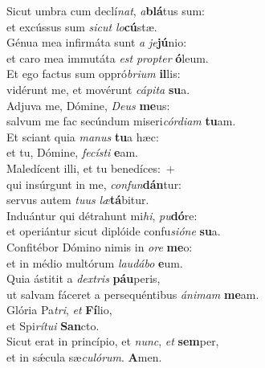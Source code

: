 \evenverse Sicut umbra cum declí\textit{nat}, \textit{a}\textbf{blá}tus sum:~\*\\
\evenverse et excússus sum \textit{si}\textit{cut} \textit{lo}\textbf{cú}stæ.\\
\oddverse Génua mea infirmáta sunt \textit{a} \textit{je}\textbf{jú}nio:~\*\\
\oddverse et caro mea immutáta \textit{est} \textit{prop}\textit{ter} \textbf{ó}leum.\\
\evenverse Et ego factus sum oppró\textit{bri}\textit{um} \textbf{il}lis:~\*\\
\evenverse vidérunt me, et movérunt \textit{cá}\textit{pi}\textit{ta} \textbf{su}a.\\
\oddverse Adjuva me, Dómine, \textit{De}\textit{us} \textbf{me}us:~\*\\
\oddverse salvum me fac secúndum miseri\textit{cór}\textit{di}\textit{am} \textbf{tu}am.\\
\evenverse Et sciant quia \textit{ma}\textit{nus} \textbf{tu}a hæc:~\*\\
\evenverse et tu, Dómine, \textit{fe}\textit{cí}\textit{sti} \textbf{e}am.\\
\oddverse Maledícent illi, et tu benedíces:~+\\
\oddverse  qui insúrgunt in me, \textit{con}\textit{fun}\textbf{dán}tur:~\*\\
\oddverse servus autem \textit{tu}\textit{us} \textit{læ}\textbf{tá}bitur.\\
\evenverse Induántur qui détrahunt mi\textit{hi}, \textit{pu}\textbf{dó}re:~\*\\
\evenverse et operiántur sicut diplóide confu\textit{si}\textit{ó}\textit{ne} \textbf{su}a.\\
\oddverse Confitébor Dómino nimis in \textit{o}\textit{re} \textbf{me}o:~\*\\
\oddverse et in médio multórum \textit{lau}\textit{dá}\textit{bo} \textbf{e}um.\\
\evenverse Quia ástitit a \textit{dex}\textit{tris} \textbf{páu}peris,~\*\\
\evenverse ut salvam fáceret a persequéntibus \textit{á}\textit{ni}\textit{mam} \textbf{me}am.\\
\oddverse Glória Pa\textit{tri}, \textit{et} \textbf{Fí}lio,~\*\\
\oddverse et Spi\textit{rí}\textit{tu}\textit{i} \textbf{San}cto.\\
\evenverse Sicut erat in princípio, et \textit{nunc}, \textit{et} \textbf{sem}per,~\*\\
\evenverse et in sǽcula sæ\textit{cu}\textit{ló}\textit{rum}. \textbf{A}men.\\
